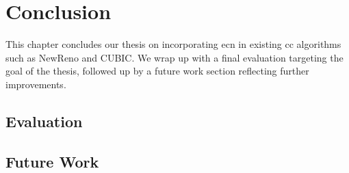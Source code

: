 \chapter{Conclusion} \label{conclusion}

This chapter concludes our thesis on incorporating \gls{ecn} in existing \gls{cc} algorithms such as NewReno and CUBIC. We wrap up with a final evaluation targeting the goal of the thesis, followed up by a future work section reflecting further improvements.










\section{Evaluation}










\section{Future Work}

